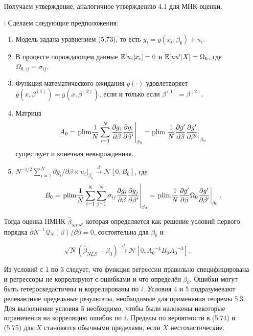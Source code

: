 Получаем утверждение, аналогичное утверждению 4.1 для МНК-оценки.

\begin{proposition}: Сделаем следующие предположения:
\begin{enumerate}
\item Модель задана уравнением (5.73), то есть $y_i=g(x_i,\beta_0)+u_i$.
\item В процессе порождающем данные $\mathbb{E}[u_i|x_i]=0$ и $\mathbb{E}[uu'|X]=\Omega_0$, где $\Omega_{0,ij}=\sigma_{ij}$.
\item Функция математического ожидания  $g(\cdot)$ удовлетворяет $g(x,\beta^{(1)})=g(x,\beta^{(2)})$, если и только если $\beta^{(1)}=\beta^{(2)}$.
\item Матрица
\begin{equation}
A_0= \left. \mathrm{plim } \frac{1}{N} \sum_{i=1}^{N} \frac{\partial g_i}{\partial \beta} \frac{\partial g_i}{\partial \beta'} \right|_{\beta_0} =\mathrm{plim } \left. \frac{1}{N} \frac{\partial g'}{\partial \beta} \frac{\partial g'}{\partial \beta'} \right|_{\beta_0}
\end{equation}
существует и конечная невырожденная.
\item $N^{-1/2} \sum_{i=1}^{N} \partial g_i/ \partial \beta \times u_i|_{\beta_0} \xrightarrow{d} \mathcal{N}[0,B_0]$, где
\begin{equation}
B_0= \left. \mathrm{plim } \frac{1}{N} \sum_{i=1}^{N} \sum_{j=1}^{N} \sigma_{ij} \frac{\partial g_i}{\partial \beta} \frac{\partial g_j}{\partial \beta'} \right|_{\beta_0} = \left. \mathrm{plim } \frac{1}{N} \frac{\partial g'}{\partial \beta} \Omega_0 \frac{\partial g'}{\partial \beta'} \right|_{\beta_0}.
\end{equation}
\end{enumerate}

Тогда оценка НМНК $\hat{\beta}_{NLS}$, которая определяется как решение условий первого порядка $\partial N^{-1} \mathcal{Q}_{N}(\beta)/ \partial \beta=0$, состоятельна для $\beta_0$ и

\begin{equation}
\sqrt{N}(\hat{\beta}_{NLS}-\beta_0) \xrightarrow{d} \mathcal{N}[0,{A_0}^{-1}B_0{A_0}^{-1}].
\end{equation}
\end{proposition}

Из условий с 1 по 3 следует, что функция регрессии правильно специфицирована и регрессоры не коррелируют с ошибками и что определён $\beta_0$. Ошибки могут быть гетероскедастичны и коррелированы по $i$. Условия 4 и 5 подразумевают релевантные предельные результаты, необходимые для применения теоремы 5.3. Для выполнения условия 5 необходимо, чтобы были наложены некоторые ограничения на корреляцию ошибок по $i$. Пределы по вероятности в (5.74) и (5.75) для $X$ становятся обычными пределами, если $X$ нестохастические.

